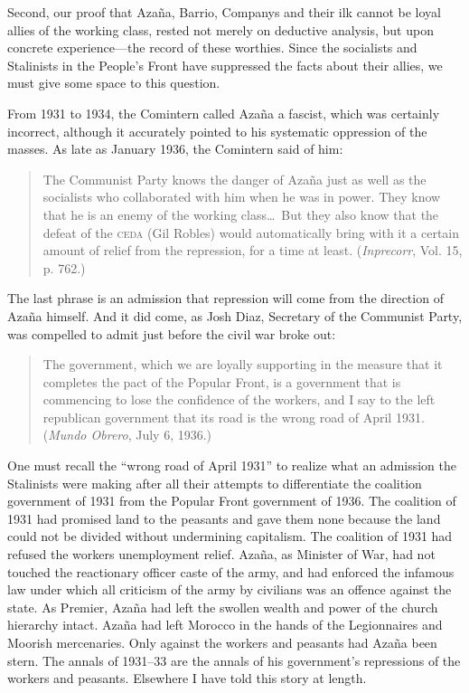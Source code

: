 Second, our proof that Azaña, Barrio, Companys and their ilk cannot be loyal allies of the working class, rested not merely on deductive analysis, but upon concrete experience---the record of these worthies. Since the socialists and Stalinists in the People’s Front have suppressed the facts about their allies, we must give some space to this question.

From 1931 to 1934, the Comintern called Azaña a fascist, which was certainly incorrect, although it accurately pointed to his systematic oppression of the masses. As late as January 1936, the Comintern said of him:

\begin{quotation}
  The Communist Party knows the danger of Azaña just as well as the socialists who collaborated with him when he was in power. They know that he is an enemy of the working class\ldots\ But they also know that the defeat of the \textsc{ceda} (Gil Robles) would automatically bring with it a certain amount of relief from the repression, for a time at least. (\emph{Inprecorr}, Vol. 15, p. 762.)
\end{quotation}

The last phrase is an admission that repression will come from the direction of Azaña himself. And it did come, as Josh Diaz, Secretary of the Communist Party, was compelled to admit just before the civil war broke out:

\begin{quotation}
  The government, which we are loyally supporting in the measure that it completes the pact of the Popular Front, is a government that is commencing to lose the confidence of the workers, and I say to the left republican government that its road is the wrong road of April 1931. (\emph{Mundo Obrero}, July 6, 1936.)
\end{quotation}

One must recall the ``wrong road of April 1931'' to realize what an admission the Stalinists were making after all their attempts to differentiate the coalition government of 1931 from the Popular Front government of 1936. The coalition of 1931 had promised land to the peasants and gave them none because the land could not be divided without undermining capitalism. The coalition of 1931 had refused the workers unemployment relief. Azaña, as Minister of War, had not touched the reactionary officer caste of the army, and had enforced the infamous law under which all criticism of the army by civilians was an offence against the state. As Premier, Azaña had left the swollen wealth and power of the church hierarchy intact. Azaña had left Morocco in the hands of the Legionnaires and Moorish mercenaries. Only against the workers and peasants had Azaña been stern. The annals of 1931--33 are the annals of his government’s repressions of the workers and peasants. Elsewhere\label{en:CivilWarReference} I have told this story at length.

